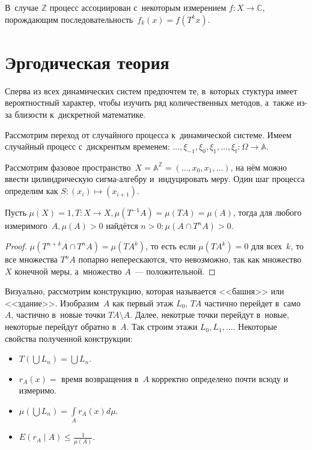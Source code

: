 \documentclass{article}
\begin{document}
\begin{definition}
	В~случае $\mathbb{Z}$ процесс ассоциирован с~некоторым измерением $f:
	X \rightarrow \mathbb{C}$, порождающим последовательность~$f_k(x) = f(T^k x)$.
\end{definition}

\section{Эргодическая теория}

Сперва из всех динамических систем предпочтем те, в~которых стуктура имеет
вероятностный характер, чтобы изучить ряд количественных методов, а~также из-за
близости к~дискретной математике.

\begin{example}
Рассмотрим переход от случайного процесса к~динамической системе. Имеем
случайный процесс с~дискрентым временем: $\ldots, \xi_{-1}, \xi_0, \xi_1,
\ldots, \xi_t: \Omega \rightarrow \mathbb{A}$.

Рассмотрим фазовое пространство~$X = \mathbb{A}^\mathbb{Z} = (\ldots, x_0, x_1,
\ldots)$, на нём можно ввести цилиндрическую сигма-алгебру и~индуцировать меру.
Один шаг процесса определим как $S: (x_i) \mapsto (x_{i+1})$.
\end{example}

\begin{theorem}
	Пусть $\mu(X) = 1, T: X \rightarrow X, \mu(T^{-1}A) = \mu(TA) = \mu(A)$,
	тогда для любого измеримого~$A, \mu(A) > 0$ найдётся $n > 0:
	\mu(A \cap T^n A) > 0$.
\end{theorem}
\begin{proof}
	$\mu(T^{n+k}A \cap T^nA) = \mu(TA^k)$, то есть если $\mu(TA^k) = 0$ для
	всех~$k$, то все множества $T^nA$ попарно неперескаются, что невозможно, так
	как множество $X$ конечной меры, а~множество $A$~--- положительной.
\end{proof}

Визуально, рассмотрим конструкцию, которая называется <<башня>> или
<<здание>>. Изобразим~$A$ как первый этаж $L_0$, $TA$ частично перейдет в~само
$A$, частично в~новые точки $TA \setminus A$. Далее, некотрые точки перейдут
в~новые, некоторые перейдут обратно в~$A$. Так строим этажи $L_0, L_1, \ldots$.
Некоторые свойства полученной конструкции:

\begin{itemize}
	\item $T(\bigcup L_n) = \bigcup L_n$.
	\item $r_A(x) = $ время возвращения в~$A$ корректно определено почти всюду и
		измеримо.
	\item $\mu(\bigcup L_n) = \int\limits_A r_A(x) d\mu$.
	\item $E(r_A \mid A) \le \frac{1}{\mu(A)}$.
\end{itemize}
\end{document}
